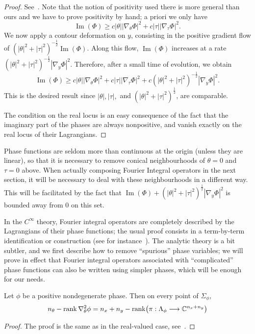 \documentclass[10pt]{amsart}
\theoremstyle{definition}\newtheorem{defi}[theo]{Definition}\newtheorem{rema}[theo]{Remark}\newtheorem{exam}[theo]{Example}\newtheorem{exem}[theo]{Example}\newtheorem{nota}[theo]{Notation}
\DeclareMathOperator{\im}{Im}
\DeclareMathOperator{\rank}{rank}
\newcommand\1{\mathds{1}}
\newcommand{\C}{\mathbb{C}}
\renewcommand*{\to}{\mathchoice{\longrightarrow}{\rightarrow}{\rightarrow}{\rightarrow}}
\let\originalleft\left
\let\originalright\right
\renewcommand{\left}{\mathopen{}\mathclose\bgroup\originalleft}
\renewcommand{\right}{\aftergroup\egroup\originalright}
\begin{document}
\begin{proof}
See~\cite[Proposition~25.5.4]{hormander_analysis_1985}. Note that the notion of positivity used there is more general than ours and we have to prove positivity by hand; a priori we only have
\[
\im(\Phi)\geq c|\theta||\nabla_{\theta}\Phi|^2+c|\tau||\nabla_{\tau}\Phi|^2.
\]
We now apply a contour deformation on $y$, consisting in the positive gradient flow of $(|\theta|^2+|\tau|^2)^{-\frac{1}{2}}\im(\Phi)$. Along this flow, $\im(\Phi)$ increases at a rate $(|\theta|^2+|\tau|^2)^{-\frac{1}{2}}|\nabla_y\Phi|^2$. Therefore, after a small time of evolution, we obtain
\[
\im(\Phi)\geq c|\theta||\nabla_{\theta}\Phi|^2+c|\tau||\nabla_{\tau}\Phi|^2+c(|\theta|^2+|\tau|^2)^{-\frac{1}{2}}|\nabla_y\Phi|^2.
\]
This is the desired result since $|\theta|, |\tau|,$ and $(|\theta|^2+|\tau|^2)^{\frac 12}$, are comparable.

The condition on the real locus is an easy consequence of the fact that the imaginary part of the phases are always nonpositive, and vanish exactly on the real locus of their Lagrangians.
\end{proof}

Phase functions are seldom more than continuous at the origin (unless they are linear), so that it is necessary to remove conical neighbourhoods of $\theta=0$ and $\tau=0$ above. When actually composing Fourier {Integral} operators in the next section, it will be necessary to deal with these neighbourhoods in a different way. This will be facilitated by the fact that $\im(\Phi)+(|\theta|^2+|\tau|^2)^{\frac 12}|\nabla_y\Phi|^2$ is bounded away from $0$ on this set.



In the $C^{\infty}$ theory, Fourier {integral operators} are completely described by the Lagrangians of their phase functions; the usual proof consists in a term-by-term identification or construction (see for instance~\cite[Proposition~25.1.5]{hormander_analysis_1985}). The analytic theory is a bit subtler, and we first describe how to remove ``spurious'' phase variables; we will prove in effect that Fourier {integral operators} associated with ``complicated'' phase functions can also be written using simpler phases, which will be enough for our needs.

\begin{prop}\label{prop:excess}
Let $\phi$ be a positive
nondegenerate phase. Then on every point of $\Sigma_{\phi}$,
\[
n_{\theta}-\rank\nabla^2_{\theta}\phi=n_x+n_y-\rank\left(\pi:\Lambda_{\phi}\to\C^{n_x+n_y}\right)
\]
\end{prop}
\begin{proof}
The proof is the same as in the real-valued case, see~\cite[Proposition~18.4.1]{treves_analytic_2022}.
\end{proof}
\end{document}
